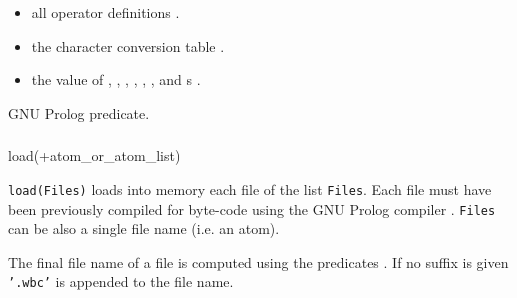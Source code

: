 \begin{itemize}

\item all operator definitions .

\item the character conversion table .

\item the value of , ,
  , , ,
  ,  and
   s .

\end{itemize}

\begin{PlErrors}




\end{PlErrors}

\Portability

GNU Prolog predicate.

\subsubsection{\label{load/1}}

\begin{TemplatesOneCol}
load(+atom\_or\_atom\_list)

\end{TemplatesOneCol}

\Description

\texttt{load(Files)} loads into memory each file of the list
\texttt{Files}. Each file must have been previously compiled for byte-code
using the GNU Prolog compiler .
\texttt{Files} can be also a single file name (i.e. an atom).

The final file name of a file is computed using the predicates
 . If no
suffix is given \texttt{'.wbc'} is appended to the file name.


